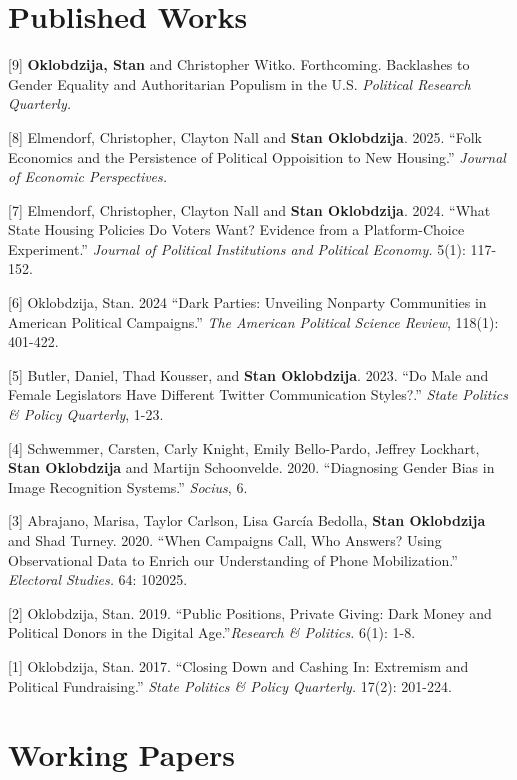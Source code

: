 \documentclass[margin,line]{res}
\begin{document}
\begin{resume}
\section{\sc Published Works}

[9] \textbf{Oklobdzija, Stan} and Christopher Witko. Forthcoming. Backlashes to Gender Equality and Authoritarian
Populism in the U.S. \textit{Political Research Quarterly.}

[8] Elmendorf, Christopher, Clayton Nall and \textbf{Stan Oklobdzija}. 2025. ``Folk Economics and the Persistence of Political Oppoisition to New Housing.'' \textit{Journal of Economic Perspectives.}

[7] Elmendorf, Christopher, Clayton Nall and \textbf{Stan Oklobdzija}. 2024. ``What State Housing Policies Do Voters Want? Evidence from a Platform-Choice Experiment.'' \textit{Journal of Political Institutions and Political Economy.} 5(1): 117-152.

[6] Oklobdzija, Stan. 2024 ``Dark Parties: Unveiling Nonparty Communities in American Political Campaigns.'' \textit{The American Political Science Review}, 118(1): 401-422.  

[5] Butler, Daniel, Thad Kousser, and \textbf{Stan Oklobdzija}. 2023. ``Do Male and Female Legislators Have Different Twitter Communication Styles?.'' \textit{State Politics \& Policy Quarterly}, 1-23.
 
[4] Schwemmer, Carsten, Carly Knight, Emily Bello-Pardo, Jeffrey Lockhart, \textbf{Stan Oklobdzija} and Martijn Schoonvelde. 2020. ``Diagnosing Gender Bias in Image Recognition Systems.'' \textit{Socius}, 6. 

[3] Abrajano, Marisa, Taylor Carlson, Lisa Garc\'ia Bedolla, \textbf{Stan Oklobdzija} and Shad Turney. 2020. ``When Campaigns Call, Who Answers? Using Observational Data to Enrich our Understanding of Phone Mobilization.''  \textit{Electoral Studies.} 64: 102025.

[2] Oklobdzija, Stan. 2019. ``Public Positions, Private Giving: Dark Money and Political Donors in the Digital Age.''\textit{Research \& Politics.} 6(1): 1-8.

[1] Oklobdzija, Stan. 2017. ``Closing Down and Cashing In: Extremism and Political Fundraising.'' \textit{State Politics \& Policy Quarterly.} 17(2): 201-224.



\section{\sc Working Papers}


\end{resume}
\end{document}

